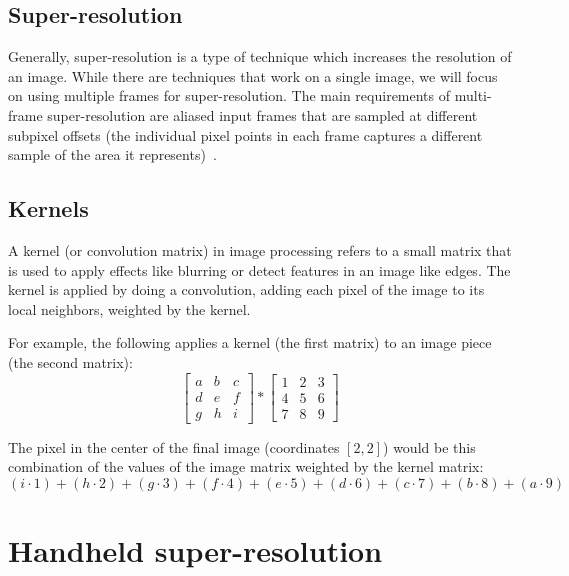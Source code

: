 \documentclass{sig-alternate}
\begin{document}
\subsection{Super-resolution}
\label{sec:background:superResolution}

Generally, super-resolution is a type of technique which increases the resolution of an image. While there are techniques that work on a single image, we will focus on using multiple frames for super-resolution. 
The main requirements of multi-frame super-resolution are aliased input frames that are sampled at different subpixel offsets (the individual pixel points in each frame captures a different sample of the area it represents)~\cite{Wronski2019}. 


\subsection{Kernels}
\label{sec:background:kernels}

A kernel (or convolution matrix) in image processing refers to a small matrix that is used to apply effects like blurring or detect features in an image like edges. The kernel is applied by doing a convolution, adding each pixel of the image to its local neighbors, weighted by the kernel. \cite{wiki:kernel}

For example, the following applies a kernel (the first matrix) to an image piece (the second matrix):
\begin{equation*}
\begin{bmatrix}
a & b & c \\
d & e & f \\
g & h & i
\end{bmatrix}
*
\begin{bmatrix}
1 & 2 & 3 \\
4 & 5 & 6 \\
7 & 8 & 9
\end{bmatrix}
\end{equation*}

The pixel in the center of the final image (coordinates $[2,2]$) would be this combination of the values of the image matrix weighted by the kernel matrix:
\begin{equation*}
(i \cdot 1)+(h \cdot 2)+(g \cdot 3)+(f \cdot 4)+(e \cdot 5)+(d \cdot 6)+(c \cdot 7)+(b \cdot 8)+(a \cdot 9)
\end{equation*}

\section{Handheld super-resolution}
\label{sec:handheldSuperRes}
\end{document}
